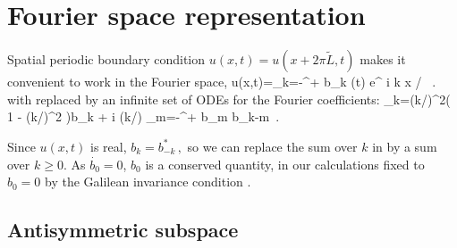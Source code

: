 \section{Fourier space representation} 
\label{s:FourierModes}



\noindent
Spatial periodic boundary condition $u(x,t)=u(x+2\pi\tilde{L},t)$
makes it convenient to work in the Fourier space, 
\beq
  u(x,t)=\sum_{k=-\infty}^{+\infty} b_k (t) e^{ i k x / }
\, .
with  replaced by an infinite set of 
ODEs for the Fourier coefficients:
\beq
_k=(k/)^2\left( 1 - (k/)^2  \right)b_k 
 	 + i (k/) \sum_{m=-\infty}^{+\infty} b_m b_{k-m}
\,.
%


Since $u(x,t)$ is real,
$ %
b_k=b_{-k}^*
\,,
$ %
so we can replace the sum over $k$ in  by a
sum over $k \geq 0$.
As  $\dot{b_0}=0$, $b_0$ is a conserved quantity,
in our calculations
fixed to $b_0=0$ by
the Galilean invariance condition .


\subsection{Antisymmetric subspace} 
\label{s:AntisymmSubsp}


